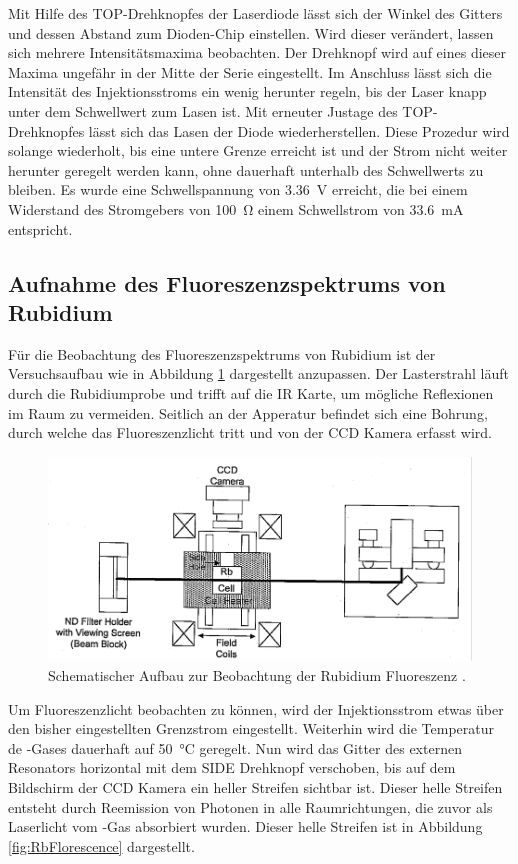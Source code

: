 Mit Hilfe des TOP-Drehknopfes der Laserdiode lässt sich der Winkel des Gitters und
dessen Abstand zum Dioden-Chip einstellen.
Wird dieser verändert, lassen sich mehrere Intensitätsmaxima beobachten.
Der Drehknopf wird auf eines dieser Maxima ungefähr in der Mitte der Serie eingestellt.
Im Anschluss lässt sich die Intensität des Injektionsstroms ein wenig herunter regeln,
bis der Laser knapp unter dem Schwellwert zum Lasen ist.
Mit erneuter Justage des TOP-Drehknopfes lässt sich das Lasen der Diode wiederherstellen.
Diese Prozedur wird solange wiederholt, bis eine untere Grenze erreicht ist und der
Strom nicht weiter herunter geregelt werden kann, ohne dauerhaft unterhalb des
Schwellwerts zu bleiben.
Es wurde eine Schwellspannung von \SI{3.36}{\volt} erreicht, die bei einem Widerstand
des Stromgebers von \SI{100}{\ohm} einem Schwellstrom von \SI{33.6}{\milli\ampere} entspricht.


\subsection{Aufnahme des Fluoreszenzspektrums von Rubidium}
\label{sec:Rb-Fluoreszenz}

Für die Beobachtung des Fluoreszenzspektrums von Rubidium ist der Versuchsaufbau
wie in Abbildung \ref{fig:RbFlorescenceSetup} dargestellt anzupassen.
Der Lasterstrahl läuft durch die Rubidiumprobe und trifft auf die IR Karte,
um mögliche Reflexionen im Raum zu vermeiden.
Seitlich an der Apperatur befindet sich eine Bohrung, durch welche das
Fluoreszenzlicht tritt und von der CCD Kamera erfasst wird.

\begin{figure}
	\centering
	\includegraphics[width=.8\textwidth, angle=1, origin=c]{images/RbFlorescenceSetup.pdf}
	\caption{Schematischer Aufbau zur Beobachtung der Rubidium Fluoreszenz \cite{anleitung}.}
	\label{fig:RbFlorescenceSetup}
\end{figure}

Um Fluoreszenzlicht beobachten zu können, wird der Injektionsstrom etwas über den
bisher eingestellten Grenzstrom eingestellt.
Weiterhin wird die Temperatur de -Gases dauerhaft auf \SI{50}{\celsius} geregelt.
Nun wird das Gitter des externen Resonators horizontal mit dem SIDE Drehknopf
verschoben, bis auf dem Bildschirm der CCD Kamera ein heller Streifen sichtbar ist.
Dieser helle Streifen entsteht durch Reemission von Photonen in alle
Raumrichtungen, die zuvor als Laserlicht vom -Gas absorbiert wurden.
Dieser helle Streifen ist in Abbildung \ref{fig:RbFlorescence} dargestellt.

